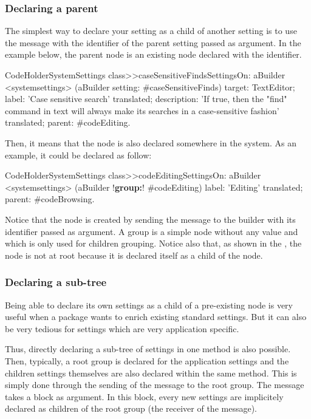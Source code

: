 \documentclass[a4paper,10pt,twoside]{book}
\begin{document}
\subsubsection{Declaring a parent}
The simplest way to declare your setting as a child of another setting is to use the  message with the identifier of the parent setting passed as argument. In the example below, the parent node is an existing node declared with the  identifier. 
\begin{code}{}
CodeHolderSystemSettings class>>caseSensitiveFindsSettingsOn: aBuilder
	<systemsettings>
	(aBuilder setting: #caseSensitiveFinds) 
		target: TextEditor;
		label: 'Case sensitive search' translated;
		description: 'If true, then the "find" command in text will always make its searches in a case-sensitive fashion' translated;
		parent: #codeEditing.
\end{code}
Then, it means that the  node is also declared somewhere in the system. As an example, it could be declared as follow:
\begin{code}{}
CodeHolderSystemSettings class>>codeEditingSettingsOn: aBuilder
	<systemsettings>
	(aBuilder !\textbf{group:}! #codeEditing) 
		label: 'Editing' translated;
		parent: #codeBrowsing.
\end{code}
Notice that the  node is created by sending the  message to the builder with its identifier passed as argument. A group is a simple node without any value and which is only used for children grouping. Notice also that, as shown in the , the  node is not at root because it is declared itself as a child of the  node.

\subsubsection{Declaring a sub-tree}
Being able to declare its own settings as a child of a pre-existing node is very useful when a package wants to enrich existing standard settings. But it can also be very tedious for settings which are very application specific. 

Thus, directly declaring a sub-tree of settings in one method is also possible. Then, typically, a root group is declared for the application settings and the children settings themselves are also declared within the same method. This is simply done through the sending of the  message to the root group. The  message takes a block as argument. In this block, every new settings are implicitely declared as children of the root group (the receiver of the  message). 
\end{document}
